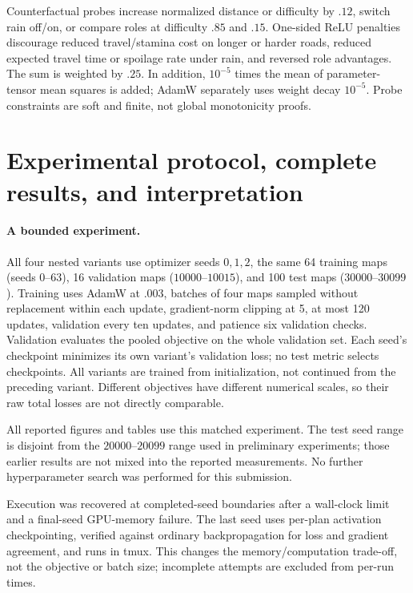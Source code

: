 Counterfactual probes increase normalized distance or difficulty by $.12$,
switch rain off/on, or compare roles at difficulty $.85$ and $.15$. One-sided
ReLU penalties discourage reduced travel/stamina cost on longer or harder roads,
reduced expected travel time or spoilage rate under rain, and reversed role
advantages. The sum is weighted by $.25$. In addition, $10^{-5}$ times the mean
of parameter-tensor mean squares is added; AdamW separately uses weight decay
$10^{-5}$. Probe constraints are soft and finite, not global monotonicity proofs.

\section{Experimental protocol, complete results, and interpretation}
\label{app:results}

\paragraph{A bounded experiment.}
All four nested variants use optimizer seeds $0,1,2$, the same 64 training maps
(seeds $0$--$63$), 16 validation maps ($10000$--$10015$), and 100 test maps
($30000$--$30099$). Training uses AdamW at $.003$, batches of four maps sampled
without replacement within each update, gradient-norm clipping at 5, at most
120 updates, validation every ten updates, and patience six validation checks.
Validation evaluates the pooled objective on the whole validation set. Each
seed's checkpoint minimizes its own variant's validation loss; no test metric
selects checkpoints. All variants are trained from initialization, not continued
from the preceding variant. Different objectives have different numerical
scales, so their raw total losses are not directly comparable.

All reported figures and tables use this matched experiment. The test seed
range is disjoint from the $20000$--$20099$ range used in preliminary experiments;
those earlier results are not mixed into the reported measurements. No further
hyperparameter search was performed for this submission.

Execution was recovered at completed-seed boundaries after a wall-clock limit
and a final-seed GPU-memory failure. The last seed uses per-plan activation
checkpointing, verified against ordinary backpropagation for loss and gradient
agreement, and runs in tmux. This changes the memory/computation trade-off, not
the objective or batch size; incomplete attempts are excluded from per-run times.

